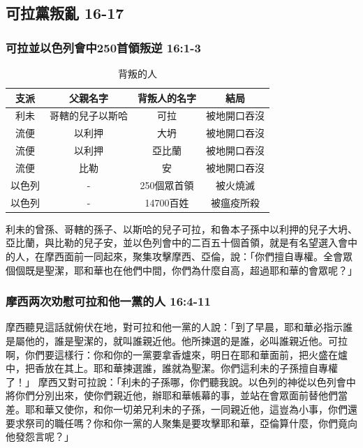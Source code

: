 \subsection{可拉黨叛亂 16-17}
\subsubsection{可拉並以色列會中250首領叛逆 16:1-3}
\begin{table}
\vspace*{-20mm}
\centering
\begin{tabular}{|c|c|c|c|}
\hline
\hline
支派 & 父親名字&背叛人的名字&  結局 \\ \hline\hline
利未 &哥轄的兒子以斯哈 & 可拉 &被地開口吞沒\\ \hline
流便 & 以利押    &大坍&被地開口吞沒\\\hline
流便 & 以利押    &亞比蘭&被地開口吞沒\\\hline
流便 & 比勒    &安&被地開口吞沒\\\hline
以色列& -& 250個眾首領 &被火燒滅\\\hline
以色列& -& 14700百姓 &被瘟疫所殺\\\hline\hline
\end{tabular}
\caption{背叛的人}
\end{table}
利未的曾孫、哥轄的孫子、以斯哈的兒子可拉，和魯本子孫中以利押的兒子大坍、亞比蘭，與比勒的兒子安，並以色列會中的二百五十個首領，就是有名望選入會中的人，在摩西面前一同起來，聚集攻擊摩西、亞倫，說：「你們擅自專權。全會眾個個既是聖潔，耶和華也在他們中間，你們為什麼自高，超過耶和華的會眾呢？」

\subsubsection{摩西两次劝慰可拉和他一黨的人 16:4-11}
摩西聽見這話就俯伏在地，對可拉和他一黨的人說：「到了早晨，耶和華必指示誰是屬他的，誰是聖潔的，就叫誰親近他。他所揀選的是誰，必叫誰親近他。可拉啊，你們要這樣行：你和你的一黨要拿香爐來，明日在耶和華面前，把火盛在爐中，把香放在其上。耶和華揀選誰，誰就為聖潔。你們這利未的子孫擅自專權了！」 
摩西又對可拉說：「利未的子孫哪，你們聽我說。以色列的神從以色列會中將你們分別出來，使你們親近他，辦耶和華帳幕的事，並站在會眾面前替他們當差。耶和華又使你，和你一切弟兄利未的子孫，一同親近他，這豈為小事，你們還要求祭司的職任嗎？你和你一黨的人聚集是要攻擊耶和華，亞倫算什麼，你們竟向他發怨言呢？」

